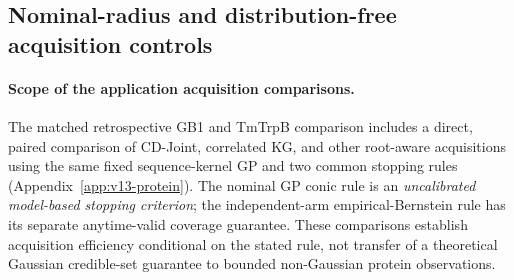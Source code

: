 \documentclass{article}
\theoremstyle{plain}
\theoremstyle{definition}
\begin{document}
\subsection{Nominal-radius and distribution-free acquisition controls}

\paragraph{Scope of the application acquisition comparisons.}
The matched retrospective GB1 and TmTrpB comparison includes a direct, paired comparison of CD-Joint, correlated KG, and other root-aware acquisitions using the same fixed sequence-kernel GP and two common stopping rules (Appendix~\ref{app:v13-protein}). The nominal GP conic rule is an \emph{uncalibrated model-based stopping criterion}; the independent-arm empirical-Bernstein rule has its separate anytime-valid coverage guarantee. These comparisons establish acquisition efficiency conditional on the stated rule, not transfer of a theoretical Gaussian credible-set guarantee to bounded non-Gaussian protein observations.
\end{document}

